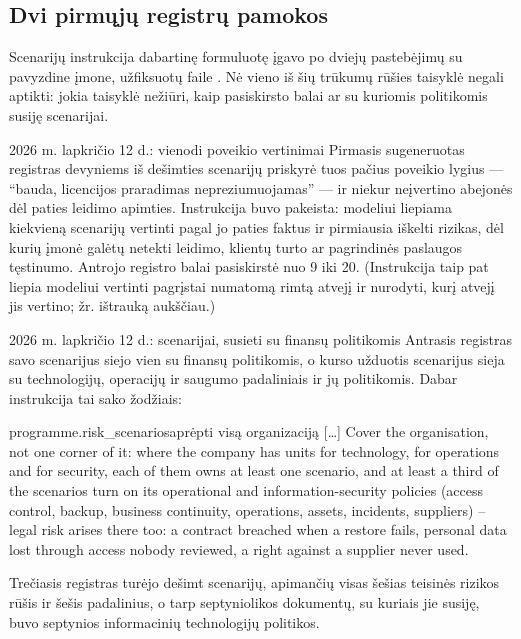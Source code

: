 \subsection{Dvi pirmųjų registrų pamokos}

Scenarijų instrukcija dabartinę formuluotę įgavo po dviejų pastebėjimų su pavyzdine įmone,
užfiksuotų faile . Nė vieno iš šių trūkumų rūšies taisyklė negali
aptikti: jokia taisyklė nežiūri, kaip pasiskirsto balai ar su kuriomis politikomis susiję
scenarijai.

\begin{lessonbox}{2026 m. lapkričio 12 d.: vienodi poveikio vertinimai}
Pirmasis \demo{} sugeneruotas registras devyniems iš dešimties scenarijų priskyrė tuos pačius
poveikio lygius --- \enquote{bauda, licencijos praradimas nepreziumuojamas} --- ir niekur
neįvertino abejonės dėl paties leidimo apimties. Instrukcija buvo pakeista: modeliui liepiama
kiekvieną scenarijų vertinti pagal jo paties faktus ir pirmiausia iškelti rizikas, dėl kurių
įmonė galėtų netekti leidimo, klientų turto ar pagrindinės paslaugos tęstinumo. Antrojo
registro balai pasiskirstė nuo 9 iki 20. (Instrukcija taip pat liepia modeliui vertinti
pagrįstai numatomą rimtą atvejį ir nurodyti, kurį atvejį jis vertino; žr. ištrauką aukščiau.)
\end{lessonbox}

\begin{lessonbox}{2026 m. lapkričio 12 d.: scenarijai, susieti su finansų politikomis}
Antrasis registras savo scenarijus siejo vien su finansų politikomis, o kurso užduotis
scenarijus sieja su technologijų, operacijų ir saugumo padaliniais ir jų politikomis. Dabar
instrukcija tai sako žodžiais:

\begin{promptexcerpt}{programme.risk_scenarios}{aprėpti visą organizaciją}
[…]
Cover the organisation, not one corner of it: where the company has units for technology, for operations and for security, each of them owns at least one scenario, and at least a third of the scenarios turn on its operational and information-security policies (access control, backup, business continuity, operations, assets, incidents, suppliers) – legal risk arises there too: a contract breached when a restore fails, personal data lost through access nobody reviewed, a right against a supplier never used.
\end{promptexcerpt}

Trečiasis registras turėjo dešimt scenarijų, apimančių visas šešias teisinės rizikos rūšis ir
šešis padalinius, o tarp septyniolikos dokumentų, su kuriais jie susiję, buvo septynios
informacinių technologijų politikos.
\end{lessonbox}


